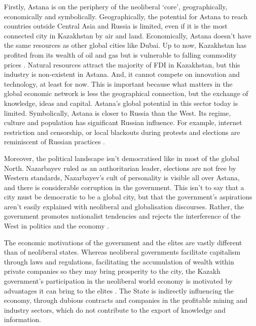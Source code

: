 \documentclass{article}
\begin{document}
Firstly, Astana is on the periphery of the neoliberal `core', geographically, economically and symbolically.  
Geographically, the potential for Astana to reach countries outside Central Asia and Russia is limited, even if it is the most connected city in Kazakhstan by air and land.
Economically, Astana doesn't have the same resources as other global cities like Dubai. Up to now, Kazakhstan has profited from its wealth of oil and gas but is vulnerable to falling commodity prices \parencite{batsaikhan2017central}. Natural resources attract the majority of FDI in Kazakhstan, but this industry is non-existent in Astana. And, it cannot compete on innovation and technology, at least for now.
This is important because what matters in the global economic network is less the geographical connection, but the exchange of knowledge, ideas and capital. Astana's global potential in this sector today is limited.
Symbolically, Astana is closer to Russia than the West. Its regime, culture and population has significant Russian influence. For example, internet restriction and censorship, or local blackouts during protests and elections are reminiscent of Russian practices \parencite{freedomhouse2021}.

Moreover, the political landscape isn't democratised like in most of the global North. Nazarbayev ruled as an authoritarian leader, elections are not free by Western standards, Nazarbayev's cult of personality is visible all over Astana, and there is considerable corruption in the government. This isn't to say that a city must be democratic to be a global city, but that the government's aspirations aren't easily explained with neoliberal and globalisation discourses. Rather, the government promotes nationalist tendencies and rejects the interference of the West in politics and the economy \parencite{koch2013not}. 

The economic motivations of the government and the elites are vastly different than of neoliberal states. Whereas neoliberal governments facilitate capitalism through laws and regulations, facilitating the accumulation of wealth within private companies so they may bring prosperity to the city, the Kazakh government's participation in the neoliberal world economy is motivated by advantages it can bring to the elites \parencite{gallo2021three}. The State is indirectly influencing the economy, through dubious contracts and companies in the profitable mining and industry sectors, which do not contribute to the export of knowledge and information.
\end{document}
